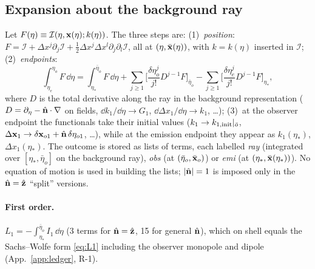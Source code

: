 \subsection{Expansion about the background ray}
\label{sec:expansion}
Let $F(\eta)\equiv\mathcal I(\eta,\mathbf x(\eta);k(\eta))$.  The three steps are:
(1)~\emph{position}: $F=\mathcal I+\Delta x^j\partial_j\mathcal I+\tfrac12\Delta x^j\Delta x^l\partial_j\partial_l\mathcal I$, all at $(\eta,\bar{\mathbf x}(\eta))$,
with $k=k(\eta)$ inserted in $\mathcal I$;
(2)~\emph{endpoints}:
\begin{equation}
\int_{\eta_e}^{\eta_o}F\,\dd\eta=\int_{\eta_*}^{\bar\eta_o}F\,\dd\eta+\sum_{j\ge1}\Big[\frac{\delta\eta_o^j}{j!}D^{j-1}F\Big]_{\bar\eta_o}
-\sum_{j\ge1}\Big[\frac{\delta\eta_e^j}{j!}D^{j-1}F\Big]_{\eta_*},
\label{eq:endpoint}
\end{equation}
where $D$ is the total derivative along the ray in the background representation ($D=\partial_\eta-\hat{\mathbf n}\cdot\nabla$ on fields,
$\dd k_1/\dd\eta\to G_1$, $\dd\Delta x_1/\dd\eta\to k_1$, \ldots);
(3)~at the observer endpoint the functionals take their initial values ($k_1\to k_{1,\rm init}|_{\bar o}$,
$\Delta\mathbf x_1\to\delta\mathbf x_{o1}+\hat{\mathbf n}\,\delta\eta_{o1}$, \ldots), while at the emission endpoint they appear as $k_1(\eta_*)$, $\Delta x_1(\eta_*)$.
The outcome is stored as lists of terms, each labelled \emph{ray} (integrated over $[\eta_*,\bar\eta_o]$ on the background
ray), \emph{obs} (at $(\bar\eta_o,\bar{\mathbf x}_o)$) or \emph{emi} (at $(\eta_*,\bar{\mathbf x}(\eta_*))$).  No equation of motion is used in
building the lists; $|\hat{\mathbf n}|=1$ is imposed only in the $\hat{\mathbf n}=\hat{\mathbf z}$ ``split'' versions.

\paragraph{First order.}  $L_1=-\int_{\eta_*}^{\bar\eta_o}I_1\,\dd\eta$ (3 terms for $\hat{\mathbf n}=\hat{\mathbf z}$, 15 for general $\hat{\mathbf n}$), which on shell
equals the Sachs--Wolfe form \eqref{eq:L1} including the observer monopole and dipole (App.~\ref{app:ledger}, R-1).


